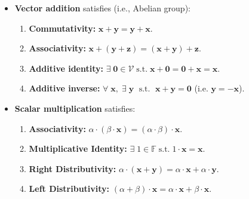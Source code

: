 \begin{definition}
    \begin{itemize}
        \item \textbf{Vector addition} satisfies (i.e., Abelian group):
            \begin{enumerate}
                \item \textbf{Commutativity:} \( \mathbf{x} + \mathbf{y} = \mathbf{y} + \mathbf{x} \).
                \item \textbf{Associativity:} \( \mathbf{x} + (\mathbf{y} + \mathbf{z}) = (\mathbf{x} + \mathbf{y}) + \mathbf{z} \).
                \item \textbf{Additive identity:} \( \exists \; \mathbf{0} \in \mathcal{V} \; \text{s.t.} \; \mathbf{x} + \mathbf{0} = \mathbf{0} + \mathbf{x} = \mathbf{x} \).
                \item \textbf{Additive inverse:} \( \forall \; \mathbf{x}, \; \exists \; \mathbf{y} \; \text{ s.t. } \; \mathbf{x} + \mathbf{y} = \mathbf{0} \) \; (i.e. \( \mathbf{y} = -\mathbf{x} \)).
            \end{enumerate}
        \item \textbf{Scalar multiplication} satisfies:
            \begin{enumerate}
                \item \textbf{Associativity:} \( \alpha \cdot (\beta \cdot \mathbf{x}) = (\alpha \cdot \beta) \cdot \mathbf{x} \).
                \item \textbf{Multiplicative Identity:} \( \exists \; 1 \in \mathbb{F} \; \text{s.t.} \; 1 \cdot \mathbf{x} = \mathbf{x} \).
                \item \textbf{Right Distributivity:} \( \alpha \cdot (\mathbf{x} + \mathbf{y}) = \alpha \cdot \mathbf{x} + \alpha \cdot \mathbf{y} \).
                \item \textbf{Left Distributivity:} \( (\alpha + \beta) \cdot \mathbf{x} = \alpha \cdot \mathbf{x} + \beta \cdot \mathbf{x} \).
            \end{enumerate}
    \end{itemize}
\end{definition}



